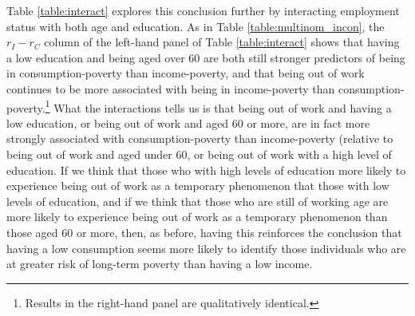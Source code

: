 
Table \ref{table:interact} explores this conclusion further by interacting employment status with both age and education. As in Table \ref{table:multinom_incon}, the $r_{I}-r_{C}$ column of the left-hand panel of Table \ref{table:interact} shows that having a low education and being aged over 60 are both still stronger predictors of being in consumption-poverty than income-poverty, and that being out of work continues to be more associated with being in income-poverty than consumption-poverty.\footnote{Results in the right-hand panel are qualitatively identical.} What the interactions tells us is that being out of work and having a low education, or being out of work and aged 60 or more, are in fact more strongly associated with consumption-poverty than income-poverty (relative to being out of work and aged under 60, or being out of work with a high level of education. If we think that those who with high levels of education more likely to experience being out of work as a temporary phenomenon that those with low levels of education, and if we think that those who are still of working age are more likely to experience being out of work as a temporary phenomenon than those aged 60 or more, then, as before, having this reinforces the conclusion that having a low consumption seems more likely to identify those individuals who are at greater risk of long-term poverty than having a low income.


